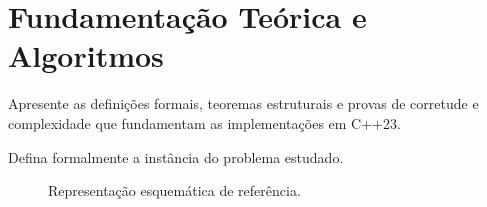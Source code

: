 \section{Fundamentação Teórica e Algoritmos}\label{sec:fundamentacao}

Apresente as definições formais, teoremas estruturais e provas de corretude e complexidade que fundamentam as implementações em C++23.

\begin{definicao}
Defina formalmente a instância do problema estudado.
\end{definicao}

\begin{figure}[!ht]
\centering

\caption{Representação esquemática de referência.}
\label{fig:ic_exemplo}
\end{figure}

